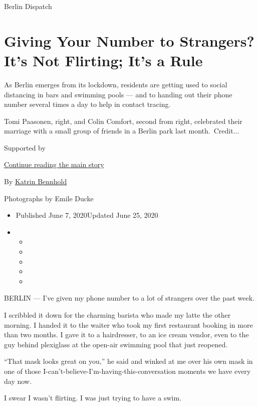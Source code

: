 Berlin Dispatch

\hypertarget{giving-your-number-to-strangers-its-not-flirting-its-a-rule}{%
\section{Giving Your Number to Strangers? It's Not Flirting; It's a
Rule}\label{giving-your-number-to-strangers-its-not-flirting-its-a-rule}}

As Berlin emerges from its lockdown, residents are getting used to
social distancing in bars and swimming pools --- and to handing out
their phone number several times a day to help in contact tracing.

Tomi Paasonen, right, and Colin Comfort, second from right, celebrated
their marriage with a small group of friends in a Berlin park last
month.~Credit...

Supported by

\protect\hyperlink{after-sponsor}{Continue reading the main story}

By \href{https://www.nytimes.com/by/katrin-bennhold}{Katrin Bennhold}

Photographs by Emile Ducke

\begin{itemize}
\item
  Published June 7, 2020Updated June 25, 2020
\item
  \begin{itemize}
  \item
  \item
  \item
  \item
  \item
  \end{itemize}
\end{itemize}

BERLIN --- I've given my phone number to a lot of strangers over the
past week.

I scribbled it down for the charming barista who made my latte the other
morning. I handed it to the waiter who took my first restaurant booking
in more than two months. I gave it to a hairdresser, to an ice cream
vendor, even to the guy behind plexiglass at the open-air swimming pool
that just reopened.

``That mask looks great on you,'' he said and winked at me over his own
mask in one of those I-can't-believe-I'm-having-this-conversation
moments we have every day now.

I swear I wasn't flirting. I was just trying to have a swim.

